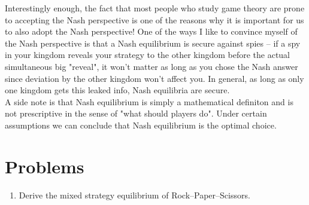 Interestingly enough, the fact that most people who study game theory are prone to accepting the 
Nash perspective is one of the reasons why it is important for us to also adopt the Nash perspective! 
One of the ways I like to convince myself of the Nash perspective is that a Nash equilibrium is 
secure against spies -- if a spy in your kingdom reveals your strategy to the other kingdom 
before the actual simultaneous big "reveal", it won't matter as long as you chose the Nash 
answer since deviation by the other kingdom won't affect you. In general, as long as only one 
kingdom gets this leaked info, Nash equilibria are secure.\\

\noindent A side note is that Nash equilibrium is simply a mathematical definiton and is not prescriptive 
in the sense of "what should players do". Under certain assumptions we can conclude 
that Nash equilibrium is the optimal choice.

\section{Problems}

\begin{enumerate}
\item Derive the mixed strategy equilibrium of Rock--Paper--Scissors.

\end{enumerate}